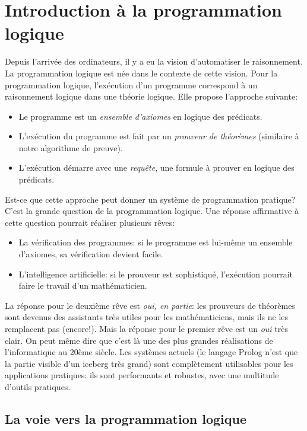 
\chapter{Introduction à la programmation logique}
\label{prolog}

Depuis l'arrivée des ordinateurs, il y a eu la vision d'automatiser le raisonnement.
La programmation logique est née dans le contexte de cette vision.
Pour la programmation logique, l'exécution d'un programme correspond à un raisonnement logique dans une théorie logique.
Elle propose l'approche suivante:
\begin{itemize} 
\item Le programme est un {\em ensemble d'axiomes} en logique des prédicats.
\item L'exécution du programme est fait par un {\em prouveur de théorèmes} (similaire à notre algorithme de preuve).
\item L'exécution démarre avec une {\em requête}, une formule à prouver en logique des prédicats.
\end{itemize}
Est-ce que cette approche peut donner un système de programmation pratique?
C'est la grande question de la programmation logique.
Une réponse affirmative à cette question pourrait réaliser plusieurs rêves:
\begin{itemize}
\item La vérification des programmes: si le programme est lui-même un ensemble d'axiomes, sa vérification devient facile.
\item L'intelligence artificielle: si le prouveur est sophistiqué, l'exécution pourrait faire le travail d'un mathématicien.
\end{itemize}
La réponse pour le deuxième rêve est {\em oui, en partie}: les prouveurs de théorèmes sont devenus
des assistants très utiles pour les mathématiciens, mais ils ne les remplacent pas (encore!).
Mais la réponse pour le premier rêve est un {\em oui} très clair.
On peut même dire que c'est là une des plus grandes réalisations de l'informatique au 20ème siècle.
Les systèmes actuels (le langage Prolog n'est que la partie visible d'un iceberg très grand)
sont complètement utilisables pour les applications pratiques:
ils sont performants et robustes, avec une multitude d'outils pratiques.

\section{La voie vers la programmation logique}

